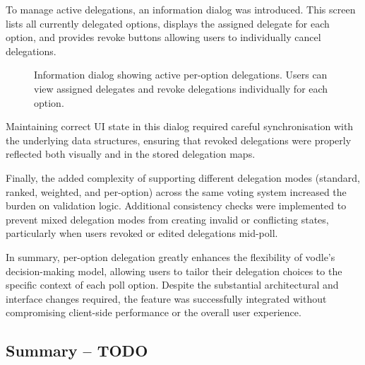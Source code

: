 To manage active delegations, an information dialog was introduced. This screen lists all currently delegated options, displays the assigned delegate for each option, and provides revoke buttons allowing users to individually cancel delegations.

\begin{figure}[H]
  \centering
  \caption{Information dialog showing active per-option delegations. Users can view assigned delegates and revoke delegations individually for each option.}
  \label{fig:per-option-delegation-management}
\end{figure}

Maintaining correct UI state in this dialog required careful synchronisation with the underlying data structures, ensuring that revoked delegations were properly reflected both visually and in the stored delegation maps.

Finally, the added complexity of supporting different delegation modes (standard, ranked, weighted, and per-option) across the same voting system increased the burden on validation logic. Additional consistency checks were implemented to prevent mixed delegation modes from creating invalid or conflicting states, particularly when users revoked or edited delegations mid-poll.

In summary, per-option delegation greatly enhances the flexibility of vodle's decision-making model, allowing users to tailor their delegation choices to the specific context of each poll option. Despite the substantial architectural and interface changes required, the feature was successfully integrated without compromising client-side performance or the overall user experience.

\subsection{Summary -- TODO}




